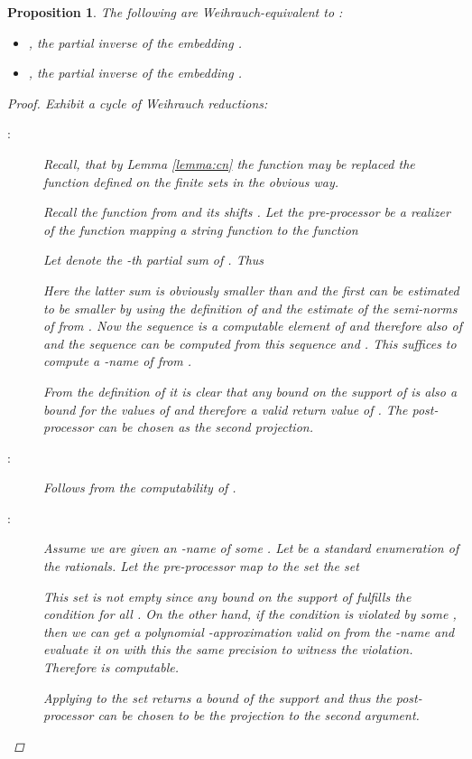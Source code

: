 \documentclass{eptcs-modified}
\newtheorem{proposition}[theorem]{Proposition}
\begin{document}
			\begin{proposition}
				The following are Weihrauch-equivalent to :
				\begin{itemize}
					\item , the partial inverse of the embedding .
					\item , the partial inverse of the embedding .
				\end{itemize}
				\begin{proof}
					Exhibit a cycle of Weihrauch reductions:
					\begin{description}
						\item[:] Recall, that by Lemma \ref{lemma:cn} the function  may be replaced the function  defined on the finite sets in the obvious way.

						Recall the function  from  and its shifts .						
						Let the pre-processor  be a realizer of the function mapping a string function  to the function
						
						Let  denote the -th partial sum of .
						Thus
						
						Here the latter sum is obviously smaller than  and the first can be estimated to be smaller by using the definition of  and the estimate of the semi-norms of  from .
						Now the sequence  is a computable element of  and therefore also of  and the sequence  can be computed from this sequence and .
						This suffices to compute a -name of  from .

						From the definition of  it is clear that any bound on the support of  is also a bound for the values of  and therefore a valid return value of .
						The post-processor  can be chosen as the second projection.
					\item[:] Follows from the computability of .
					\item[:]
						Assume we are given an -name of some .
						Let  be a standard enumeration of the rationals.
						Let the pre-processor  map  to the set the set
						
						This set is not empty since any bound on the support of  fulfills the condition for all .
						On the other hand, if the condition is violated by some , then we can get a polynomial -approximation valid on  from the -name and evaluate it on  with this the same precision to witness the violation.
						Therefore  is computable.

						Applying  to the set returns a bound of the support and thus the post-processor  can be chosen to be the projection to the second argument.
					\end{description}
				\end{proof}
			\end{proposition}
\end{document}
